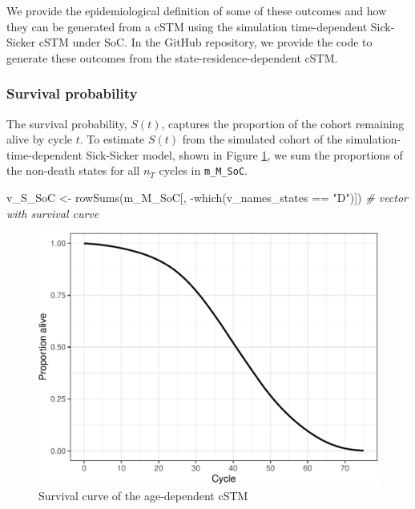 \documentclass[
]{article}
\newenvironment{Shaded}{\begin{snugshade}}{\end{snugshade}}
\newcommand{\CommentTok}[1]{\textcolor[rgb]{0.56,0.35,0.01}{\textit{#1}}}
\newcommand{\FunctionTok}[1]{\textcolor[rgb]{0.00,0.00,0.00}{#1}}
\newcommand{\NormalTok}[1]{#1}
\newcommand{\OtherTok}[1]{\textcolor[rgb]{0.56,0.35,0.01}{#1}}
\newcommand{\SpecialCharTok}[1]{\textcolor[rgb]{0.00,0.00,0.00}{#1}}
\newcommand{\StringTok}[1]{\textcolor[rgb]{0.31,0.60,0.02}{#1}}
\begin{document}
We provide the epidemiological definition of some of these outcomes and how they can be generated from a cSTM using the simulation time-dependent Sick-Sicker cSTM under SoC. In the GitHub repository, we provide the code to generate these outcomes from the state-residence-dependent cSTM.

\hypertarget{survival-probability}{%
\subsubsection{Survival probability}\label{survival-probability}}

The survival probability, \(S(t)\), captures the proportion of the cohort remaining alive by cycle \(t\). To estimate \(S(t)\) from the simulated cohort of the simulation-time-dependent Sick-Sicker model, shown in Figure \ref{fig:Sick-Sicker-Surv-AgeDep}, we sum the proportions of the non-death states for all \(n_T\) cycles in \texttt{m\_M\_SoC}.

\begin{Shaded}
\begin{Highlighting}[]
\NormalTok{v\_S\_SoC }\OtherTok{\textless{}{-}} \FunctionTok{rowSums}\NormalTok{(m\_M\_SoC[, }\SpecialCharTok{{-}}\FunctionTok{which}\NormalTok{(v\_names\_states }\SpecialCharTok{==} \StringTok{"D"}\NormalTok{)]) }\CommentTok{\# vector with survival curve}
\end{Highlighting}
\end{Shaded}

\begin{figure}[H]

{\centering \includegraphics{figs/Sick-Sicker-Surv-AgeDep-1} 

}

\caption{Survival curve of the age-dependent cSTM}\label{fig:Sick-Sicker-Surv-AgeDep}
\end{figure}
\end{document}

